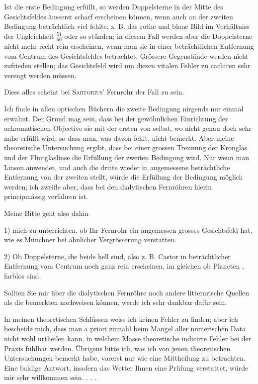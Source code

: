 \begingroup\raggedright
Ist die erste Bedingung  erfüllt, so werden Doppelsterne in der Mitte des Gesichtsfeldes äusserst scharf erscheinen können, wenn auch an der zweiten Bedingung beträchtlich viel fehlte, z. B. das rothe und blaue Bild im Verhältniss der Ungleichheit $\frac{51}{50}$ oder so stünden; in diesem Fall werden aber die Doppelsterne nicht mehr recht rein erscheinen, wenn man sie in einer beträchtlichen Entfernung vom Centrum des Gesichtsfeldes betrachtet. Grössere Gegenstände werden nicht  zufrieden stellen; das Gesichtsfeld wird um diesen vitalen Fehler zu cachiren sehr verengt werden müssen.\par\endgroup

\clearpage{}
\noindent\hspace*{\parindent}Diess alles scheint bei \textsc{Sartorius}’ Fernrohr der Fall zu sein.

Ich finde in allen optischen Büchern die zweite Bedingung nirgends nur einmal erwähnt. Der Grund mag sein, dass bei der gewöhnlichen Einrichtung der achromatischen Objective sie mit der ersten von selbst, wo nicht genau doch sehr nahe erfüllt wird, so dass man, was davon fehlt, nicht bemerkt. Aber meine theoretische Untersuchung ergibt, dass bei einer grossen Trennung der Kronglas und der Flintglaslinse die Erfüllung der zweiten Bedingung  wird. Nur wenn man  Linsen anwendet, und auch die dritte wieder in angemessene beträchtliche Entfernung von der zweiten stellt, würde die Erfüllung der Bedingung möglich werden; ich zweifle aber, dass bei den dialytischen Fernröhren hierin principmässig verfahren ist.

Meine Bitte geht also dahin

1) mich zu unterrichten, ob Ihr Fernrohr ein angemessen grosses Gesichtsfeld hat, wie es Münchner bei ähnlicher Vergrösserung verstatten.

2) Ob Doppelsterne, die beide hell sind, also z. B. Castor in beträchtlicher Entfernung vom Centrum noch ganz rein erscheinen, im gleichen ob Planeten , farblos sind.

Sollten Sie mir über die dialytischen Fernröhre noch andere litterarische Quellen als die bemerkten nachweisen können, werde ich sehr dankbar dafür sein.

In meinen theoretischen Schlüssen weiss ich keinen Fehler zu finden; aber ich bescheide mich, dass man a priori zumahl beim Mangel aller numerischen Data nicht wohl urtheilen kann, in welchem Masse theoretische indicirte Fehler bei der Praxis fühlbar werden. Übrigens bitte ich, was ich von jenen theoretischen Untersuchungen bemerkt habe, vorerst nur wie eine  Mittheilung zu betrachten. Eine baldige Antwort, insofern das Wetter Ihnen eine Prüfung verstattet, würde mir sehr willkommen sein. . . .
\clearpage\endgroup
